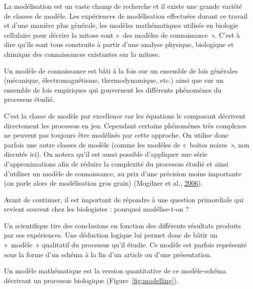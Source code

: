 \documentclass[12pt,a4paper,twoside,openright]{book}
\begin{document}
La modélisation est un vaste champ de recherche et il existe une grande
variété de classes de modèle. Les expériences de modélisation effectuées
durant ce travail et d'une manière plus générale, les modèles
mathématiques utilisés en biologie cellulaire pour décrire la mitose
sont «~des modèles de connaissance~». C'est à dire qu'ils sont tous
construits à partir d'une analyse physique, biologique et chimique des
connaissances existantes sur la mitose.

Un modèle de connaissance est bâti à la fois sur un ensemble de lois
générales (mécanique, électromagnétisme, thermodynamique, etc.) ainsi
que sur un ensemble de lois empiriques qui gouvernent les différents
phénomènes du processus étudié.

C'est la classe de modèle par excellence car les équations le composant
décrivent directement les processus en jeu. Cependant certains
phénomènes très complexes ne peuvent pas toujours être modélisés par
cette approche. On utilise donc parfois une autre classes de modèle
(comme les modèles de «~boites noires~», non discutés ici). On notera
qu'il est aussi possible d'appliquer une série d'approximations afin de
réduire la complexité du processus étudié et ainsi d'utiliser un modèle
de connaissance, au prix d'une précision moins importante (on parle
alors de modélisation gros grain) (Mogilner et al.,
\protect\hyperlink{ref-Mogilner2006a}{2006}).

Avant de continuer, il est important de répondre à une question
primordiale qui revient souvent chez les biologistes : pourquoi
modélise-t-on ?

Un scientifique tire des conclusions en fonction des différents
résultats produits par ses expériences. Une déduction logique lui permet
donc de bâtir un «~modèle~» qualitatif du processus qu'il étudie. Ce
modèle est parfois représenté sous la forme d'un schéma à la fin d'un
article ou d'une présentation.

Un modèle mathématique est la version quantitative de ce modèle-schéma
décrivant un processus biologique (Figure~\ref{fig:modelling}).
\end{document}
